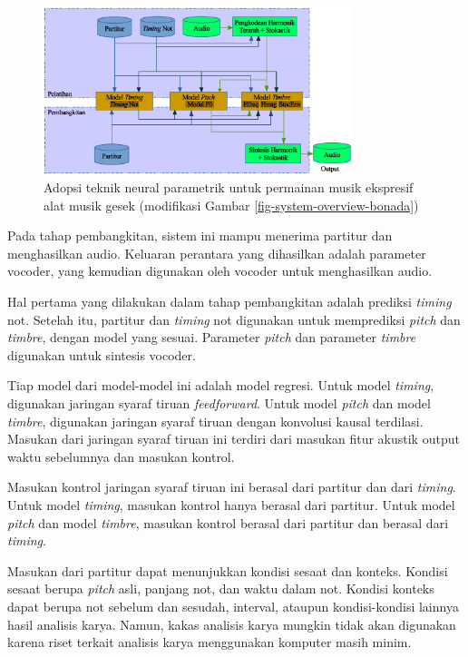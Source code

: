 \begin{figure}[h]
    \centering
    \includegraphics[width=0.8\textwidth]{resources/system-overview.eps}
    \caption{Adopsi teknik neural parametrik untuk permainan musik ekspresif alat musik gesek (modifikasi Gambar \ref{fig-system-overview-bonada})}\label{fig-system-overview} %
\end{figure}

Pada tahap pembangkitan, sistem ini mampu menerima partitur dan menghasilkan audio. Keluaran perantara yang dihasilkan adalah parameter vocoder, yang kemudian digunakan oleh vocoder untuk menghasilkan audio.

Hal pertama yang dilakukan dalam tahap pembangkitan adalah prediksi \textit{timing} not. Setelah itu, partitur dan \textit{timing} not digunakan untuk memprediksi \textit{pitch} dan \textit{timbre}, dengan model yang sesuai. Parameter \textit{pitch} dan parameter \textit{timbre} digunakan untuk sintesis vocoder.

Tiap model dari model-model ini adalah model regresi. Untuk model \textit{timing}, digunakan jaringan syaraf tiruan \textit{feedforward}. Untuk model \textit{pitch} dan model \textit{timbre}, digunakan jaringan syaraf tiruan dengan konvolusi kausal terdilasi. Masukan dari jaringan syaraf tiruan ini terdiri dari masukan fitur akustik output waktu sebelumnya dan masukan kontrol.

Masukan kontrol jaringan syaraf tiruan ini berasal dari partitur dan dari \textit{timing}. Untuk model \textit{timing}, masukan kontrol hanya berasal dari partitur. Untuk model \textit{pitch} dan model \textit{timbre}, masukan kontrol berasal dari partitur dan berasal dari \textit{timing}.

Masukan dari partitur dapat menunjukkan kondisi sesaat dan konteks. Kondisi sesaat berupa \textit{pitch} asli, panjang not, dan waktu dalam not. Kondisi konteks dapat berupa not sebelum dan sesudah, interval, ataupun kondisi-kondisi lainnya hasil analisis karya. Namun, kakas analisis karya mungkin tidak akan digunakan karena riset terkait analisis karya menggunakan komputer masih minim.

